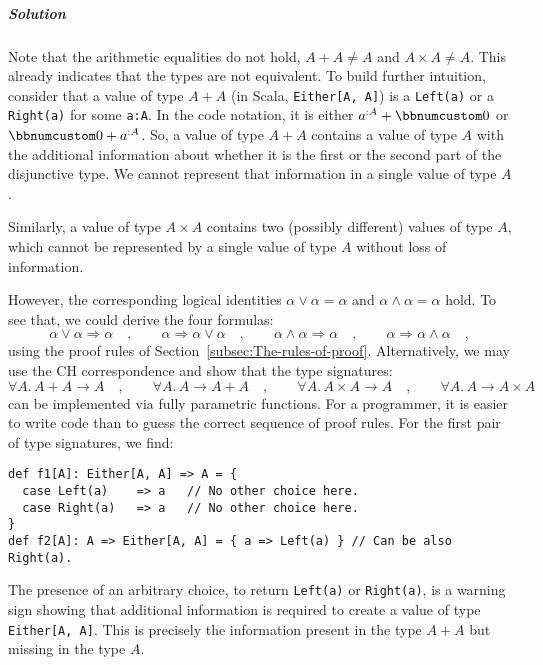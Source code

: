\subparagraph{Solution}

Note that the arithmetic equalities do not hold, $A+A\neq A$ and
$A\times A\ne A$. This already indicates that the types are not equivalent.
To build further intuition, consider that a value of type $A+A$ (in
Scala, \lstinline!Either[A, A]!) is a \lstinline!Left(a)! or a \lstinline!Right(a)!
for some \lstinline!a:A!. In the code notation, it is either $a^{:A}+\bbnum 0$
or $\bbnum 0+a^{:A}$. So, a value of type $A+A$ contains a value
of type $A$ with the additional information about whether it is the
first or the second part of the disjunctive type. We cannot represent
that information in a single value of type $A$. 

Similarly, a value of type $A\times A$ contains two (possibly different)
values of type $A$, which cannot be represented by a single value
of type $A$ without loss of information.

However, the corresponding logical identities $\alpha\vee\alpha=\alpha$
and $\alpha\wedge\alpha=\alpha$ hold. To see that, we could derive
the four formulas:
\[
\alpha\vee\alpha\Rightarrow\alpha\quad,\quad\quad\alpha\Rightarrow\alpha\vee\alpha\quad,\quad\quad\alpha\wedge\alpha\Rightarrow\alpha\quad,\quad\quad\alpha\Rightarrow\alpha\wedge\alpha\quad,
\]
using the proof rules of Section~\ref{subsec:The-rules-of-proof}.
Alternatively, we may use the CH correspondence and show that the
type signatures:
\[
\forall A.\,A+A\rightarrow A\quad,\quad\quad\forall A.\,A\rightarrow A+A\quad,\quad\quad\forall A.\,A\times A\rightarrow A\quad,\quad\quad\forall A.\,A\rightarrow A\times A\quad
\]
can be implemented via fully parametric functions. For a programmer,
it is easier to write code than to guess the correct sequence of proof
rules. For the first pair of type signatures, we find:
\begin{lstlisting}
def f1[A]: Either[A, A] => A = {
  case Left(a)    => a   // No other choice here.
  case Right(a)   => a   // No other choice here.
}
def f2[A]: A => Either[A, A] = { a => Left(a) } // Can be also Right(a).
\end{lstlisting}
The presence of an arbitrary choice, to return \lstinline!Left(a)!
or \lstinline!Right(a)!, is a warning sign showing that additional
information is required to create a value of type \lstinline!Either[A, A]!.
This is precisely the information present in the type $A+A$ but missing
in the type $A$.

